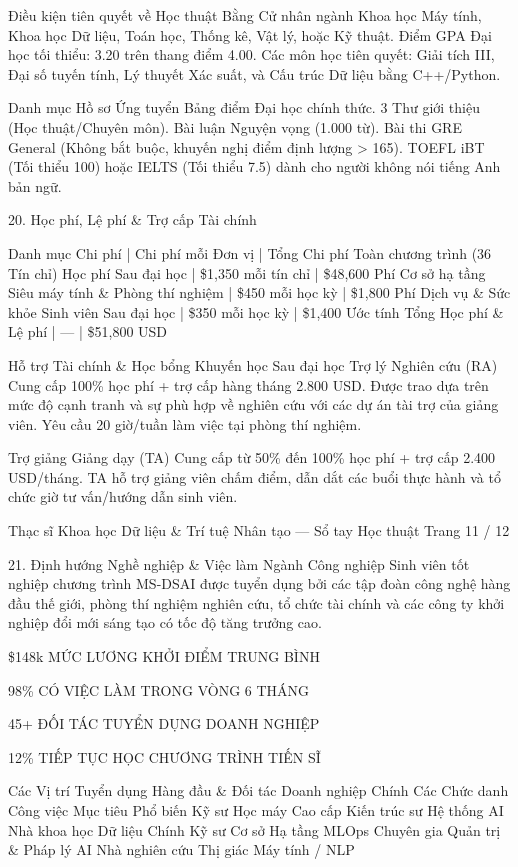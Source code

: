 \documentclass[12pt]{article}
\begin{document}
Điều kiện tiên quyết về Học thuật
Bằng Cử nhân ngành Khoa học Máy tính, Khoa học Dữ liệu, Toán học, Thống kê, Vật lý, hoặc Kỹ thuật.
Điểm GPA Đại học tối thiểu: 3.20 trên thang điểm 4.00.
Các môn học tiên quyết: Giải tích III, Đại số tuyến tính, Lý thuyết Xác suất, và Cấu trúc Dữ liệu bằng C++/Python.

Danh mục Hồ sơ Ứng tuyển
Bảng điểm Đại học chính thức.
3 Thư giới thiệu (Học thuật/Chuyên môn).
Bài luận Nguyện vọng (1.000 từ).
Bài thi GRE General (Không bắt buộc, khuyến nghị điểm định lượng > 165).
TOEFL iBT (Tối thiểu 100) hoặc IELTS (Tối thiểu 7.5) dành cho người không nói tiếng Anh bản ngữ.

20. Học phí, Lệ phí \& Trợ cấp Tài chính

Danh mục Chi phí | Chi phí mỗi Đơn vị | Tổng Chi phí Toàn chương trình (36 Tín chỉ)
Học phí Sau đại học | \$1,350 mỗi tín chỉ | \$48,600
Phí Cơ sở hạ tầng Siêu máy tính \& Phòng thí nghiệm | \$450 mỗi học kỳ | \$1,800
Phí Dịch vụ \& Sức khỏe Sinh viên Sau đại học | \$350 mỗi học kỳ | \$1,400
Ước tính Tổng Học phí \& Lệ phí | — | \$51,800 USD

Hỗ trợ Tài chính \& Học bổng Khuyến học Sau đại học
Trợ lý Nghiên cứu (RA)
Cung cấp 100\% học phí + trợ cấp hàng tháng 2.800 USD. Được trao dựa trên mức độ cạnh tranh và sự phù hợp về nghiên cứu với các dự án tài trợ của giảng viên. Yêu cầu 20 giờ/tuần làm việc tại phòng thí nghiệm.

Trợ giảng Giảng dạy (TA)
Cung cấp từ 50\% đến 100\% học phí + trợ cấp 2.400 USD/tháng. TA hỗ trợ giảng viên chấm điểm, dẫn dắt các buổi thực hành và tổ chức giờ tư vấn/hướng dẫn sinh viên.

Thạc sĩ Khoa học Dữ liệu \& Trí tuệ Nhân tạo — Sổ tay Học thuật
Trang 11 / 12

21. Định hướng Nghề nghiệp \& Việc làm Ngành Công nghiệp
Sinh viên tốt nghiệp chương trình MS-DSAI được tuyển dụng bởi các tập đoàn công nghệ hàng đầu thế giới, phòng thí nghiệm nghiên cứu, tổ chức tài chính và các công ty khởi nghiệp đổi mới sáng tạo có tốc độ tăng trưởng cao.

\$148k
MỨC LƯƠNG KHỞI ĐIỂM TRUNG BÌNH

98\%
CÓ VIỆC LÀM TRONG VÒNG 6 THÁNG

45+
ĐỐI TÁC TUYỂN DỤNG DOANH NGHIỆP

12\%
TIẾP TỤC HỌC CHƯƠNG TRÌNH TIẾN SĨ

Các Vị trí Tuyển dụng Hàng đầu \& Đối tác Doanh nghiệp Chính
Các Chức danh Công việc Mục tiêu Phổ biến
Kỹ sư Học máy Cao cấp
Kiến trúc sư Hệ thống AI
Nhà khoa học Dữ liệu Chính
Kỹ sư Cơ sở Hạ tầng MLOps
Chuyên gia Quản trị \& Pháp lý AI
Nhà nghiên cứu Thị giác Máy tính / NLP
\end{document}
